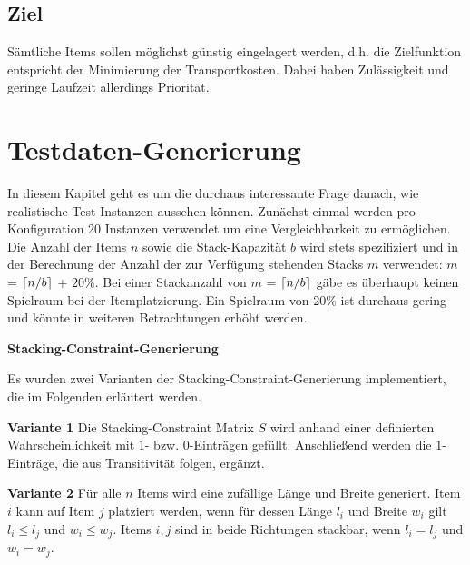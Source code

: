 \subsection{Ziel}
\label{sec:objective}

Sämtliche Items sollen möglichst günstig eingelagert werden, d.h. die Zielfunktion entspricht der Minimierung der Transportkosten.
Dabei haben Zulässigkeit und geringe Laufzeit allerdings Priorität.


\pagebreak

\section{Testdaten-Generierung}
\label{sec:test_data}

In diesem Kapitel geht es um die durchaus interessante Frage danach, wie realistische Test-Instanzen aussehen können.
Zunächst einmal werden pro Konfiguration 20 Instanzen verwendet um eine Vergleichbarkeit zu ermöglichen.
Die Anzahl der Items $n$ sowie die Stack-Kapazität $b$ wird stets spezifiziert und in der Berechnung der Anzahl
der zur Verfügung stehenden Stacks $m$ verwendet: $m$ = $\lceil n / b\rceil$ + $20 \%$.\newline
Bei einer Stackanzahl von $m$ = $\lceil n / b\rceil$ gäbe es überhaupt keinen Spielraum bei der Itemplatzierung. Ein Spielraum von $20 \%$
ist durchaus gering und könnte in weiteren Betrachtungen erhöht werden.

\textbf{Stacking-Constraint-Generierung}\newline

Es wurden zwei Varianten der Stacking-Constraint-Generierung implementiert, die im Folgenden erläutert werden.

\textbf{Variante 1}\newline
Die Stacking-Constraint Matrix $S$ wird anhand einer definierten Wahrscheinlichkeit mit $1$- bzw. $0$-Einträgen gefüllt.
Anschließend werden die 1-Einträge, die aus Transitivität folgen, ergänzt.

\textbf{Variante 2}\newline
Für alle $n$ Items wird eine zufällige Länge und Breite generiert. Item $i$ kann auf Item $j$ platziert werden,
wenn für dessen Länge $l_i$ und Breite $w_i$ gilt $l_i \leq l_j$ und $w_i \leq w_j$.
Items $i, j$ sind in beide Richtungen stackbar, wenn $l_i = l_j$ und $w_i = w_j$.

